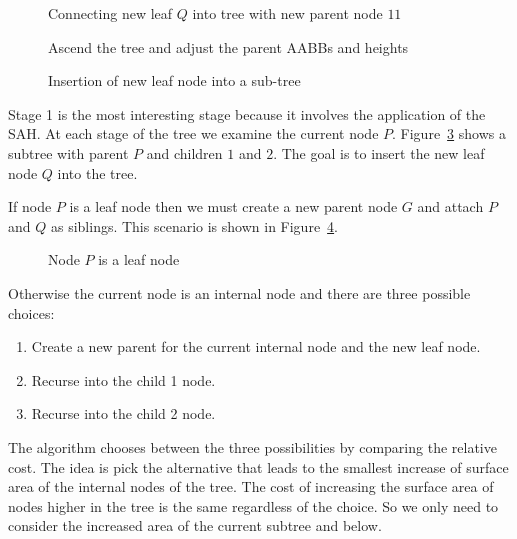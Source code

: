 \documentclass{article}
\begin{document}
\begin{figure}
	\begin{center}
		
	\end{center}
	\caption{Connecting new leaf $Q$ into tree with new parent node $11$}
	\label{fig:tree_insert2}
\end{figure}


\begin{figure}
	\begin{center}
		
	\end{center}
	\caption{Ascend the tree and adjust the parent AABBs and heights}
	\label{fig:tree_insert3}
\end{figure}

\begin{figure}
	\begin{center}
		
	\end{center}
	\caption{Insertion of new leaf node into a sub-tree}
	\label{fig:new_leaf}
\end{figure}

Stage 1 is the most interesting stage because it involves the application of the SAH. At each stage of the tree we examine the current node $P$. Figure~\ref{fig:new_leaf} shows a subtree with parent $P$ and children $1$ and $2$. The goal is to insert the new leaf node $Q$ into the tree.

If node $P$ is a leaf node then we must create a new parent node $G$ and attach $P$ and $Q$ as siblings. This scenario is shown in Figure~\ref{fig:single_leaf}.

\begin{figure}
	\begin{center}
		
	\end{center}
	\caption{Node $P$ is a leaf node}
	\label{fig:single_leaf}
\end{figure}

Otherwise the current node is an internal node and there are three possible choices:
\begin{enumerate}
	\item Create a new parent for the current internal node and the new leaf node.
	\item Recurse into the child 1 node.
	\item Recurse into the child 2 node.
\end{enumerate}
The algorithm chooses between the three possibilities by comparing the relative cost. The idea is pick the alternative that leads to the smallest increase of surface area of the internal nodes of the tree. The cost of increasing the surface area of nodes higher in the tree is the same regardless of the choice. So we only need to consider the increased area of the current subtree and below.
\end{document}
